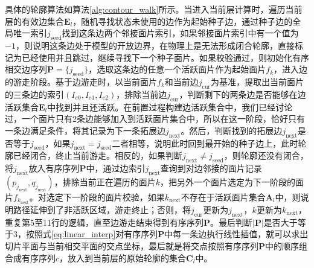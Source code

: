 具体的轮廓算法如算法\ref{alg:contour_walk}所示。当进入当前层计算时，遍历当前层的有效边集合$\bm{E}_{l}$，随机寻找状态未使用的边作为起始种子边，通过种子边的全局唯一索引$j_{\mathrm{seed}}$找到这条边两个邻接面片索引，如果邻接面片索引中有一个值为$-1$，则说明这条边处于模型的开放边界，在物理上是无法形成闭合轮廓，直接标记为已经使用并且跳过，继续寻找下一个种子面片。如果校验通过，则初始化有序相交边序列$\bm{P}=\{j_{\mathrm{seed}}\}$，选取这条边的任意一个活跃面片作为起始面片$f_{k}$，进入边的游走阶段。基于边游走时，以当前面片$f_{k}$和当前边$j_{\mathrm{cur}}$为基准，提取出当前面片的三条边的索引$(I_{e0},I_{e1},I_{e2})$，排除当前边$j_{\mathrm{cur}}$，判断剩下的两条边是否能够在边活跃集合$\bm{E}_{l}$中找到并且还活跃。在前置过程构建边活跃集合中，我们已经讨论过，一个面片只有2条边能够加入到活跃面片集合中，所以在这一阶段，恰好只有一条边满足条件，将其记录为下一条拓展边$j_{\mathrm{next}}$。然后，判断找到的拓展边$j_{\mathrm{next}}$是否等于$j_{\mathrm{seed}}$，如果$j_{\mathrm{next}}=j_{\mathrm{seed}}$二者相等，说明此时回到最开始的种子边上，此时轮廓已经闭合，终止当前游走。相反的，如果判断$j_{\mathrm{next}}\neq j_{\mathrm{seed}}$，则轮廓还没有闭合，将$j_{\mathrm{next}}$放入有序序列$\bm{P}$中，通过边索引$j_{\mathrm{next}}$查询到对边邻接的面片记录$(p_{j_{\mathrm{next}}},q_{j_{\mathrm{next}}})$，排除当前正在遍历的面片$k$，把另外一个面片选定为下一阶段的面片$f_{k_{\mathrm{next}}}$。对选定下一阶段的面片校验，如果$k_{\mathrm{next}}$不存在于活跃面片集合$\bm{A}_{l}$中，则说明路径延伸到了非活跃区域，游走终止；否则，将$j_{\mathrm{cur}}$更新为$j_{\mathrm{next}}$，$k$更新为$k_{\mathrm{next}}$，重复第5至11行的逻辑，直至边游走结束得到有序序列$\bm{P}$。最后判断$|\bm{P}|$是否大于等于3，按照式\eqref{eq:linear_interp}对有序序列$\bm{P}$中每一条边执行线性插值，就可以求出切片平面与当前相交平面的交点坐标，最后就是将交点按照有序序列$\bm{P}$中的顺序组合成有序序列$c$，放入到当前层的原始轮廓的集合$\bm{C}_{l}$中。

